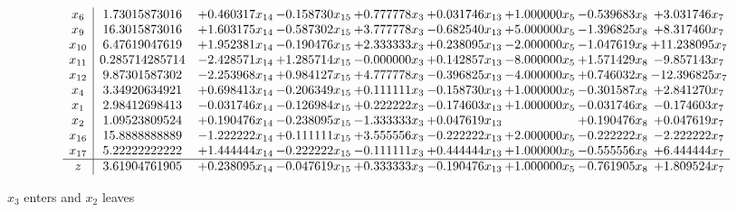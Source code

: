 \documentclass[10pt]{article}
\begin{document}
 \[\begin{array}{c| c c@{\hskip 2pt} c@{\hskip 2pt} c@{\hskip 2pt} c@{\hskip 2pt} c@{\hskip 2pt} c@{\hskip 2pt} c@{\hskip 2pt} }
 x_{6}   &  1.73015873016 & + 0.460317 x_{14} & -0.158730 x_{15} & + 0.777778 x_{3} & + 0.031746 x_{13} & + 1.000000 x_{5} & -0.539683 x_{8} & + 3.031746 x_{7}\\
 x_{9}   &  16.3015873016 & + 1.603175 x_{14} & -0.587302 x_{15} & + 3.777778 x_{3} & -0.682540 x_{13} & + 5.000000 x_{5} & -1.396825 x_{8} & + 8.317460 x_{7}\\
 x_{10}   &  6.47619047619 & + 1.952381 x_{14} & -0.190476 x_{15} & + 2.333333 x_{3} & + 0.238095 x_{13} & -2.000000 x_{5} & -1.047619 x_{8} & + 11.238095 x_{7}\\
 x_{11}   &  0.285714285714 & -2.428571 x_{14} & + 1.285714 x_{15} & -0.000000 x_{3} & + 0.142857 x_{13} & -8.000000 x_{5} & + 1.571429 x_{8} & -9.857143 x_{7}\\
 x_{12}   &  9.87301587302 & -2.253968 x_{14} & + 0.984127 x_{15} & + 4.777778 x_{3} & -0.396825 x_{13} & -4.000000 x_{5} & + 0.746032 x_{8} & -12.396825 x_{7}\\
 x_{4}   &  3.34920634921 & + 0.698413 x_{14} & -0.206349 x_{15} & + 0.111111 x_{3} & -0.158730 x_{13} & + 1.000000 x_{5} & -0.301587 x_{8} & + 2.841270 x_{7}\\
 x_{1}   &  2.98412698413 & -0.031746 x_{14} & -0.126984 x_{15} & + 0.222222 x_{3} & -0.174603 x_{13} & + 1.000000 x_{5} & -0.031746 x_{8} & -0.174603 x_{7}\\
 x_{2}   &  1.09523809524 & + 0.190476 x_{14} & -0.238095 x_{15} & -1.333333 x_{3} & + 0.047619 x_{13} &   & + 0.190476 x_{8} & + 0.047619 x_{7}\\
 x_{16}   &  15.8888888889 & -1.222222 x_{14} & + 0.111111 x_{15} & + 3.555556 x_{3} & -0.222222 x_{13} & + 2.000000 x_{5} & -0.222222 x_{8} & -2.222222 x_{7}\\
 x_{17}   &  5.22222222222 & + 1.444444 x_{14} & -0.222222 x_{15} & -0.111111 x_{3} & + 0.444444 x_{13} & + 1.000000 x_{5} & -0.555556 x_{8} & + 6.444444 x_{7}\\
\hline
z    &  3.61904761905 & + 0.238095 x_{14} & -0.047619 x_{15} & + 0.333333 x_{3} & -0.190476 x_{13} & + 1.000000 x_{5} & -0.761905 x_{8} & + 1.809524 x_{7}\\
\end{array}\]


 $ x_{3} $ enters and $ x_{2} $ leaves 
\end{document}
